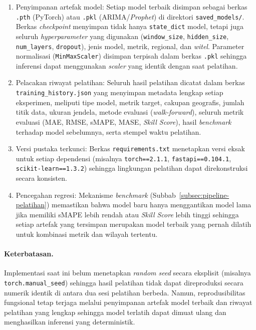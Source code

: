 \begin{enumerate}
    \item Penyimpanan artefak model: Setiap model terbaik disimpan sebagai berkas \texttt{.pth} (PyTorch) atau \texttt{.pkl} (ARIMA/\textit{Prophet}) di direktori \texttt{saved\_models/}. Berkas \textit{checkpoint} menyimpan tidak hanya \texttt{state\_dict} model, tetapi juga seluruh \textit{hyperparameter} yang digunakan (\texttt{window\_}\allowbreak\texttt{size}, \allowbreak\texttt{hidden\_}\allowbreak\texttt{size}, \allowbreak\texttt{num\_}\allowbreak\texttt{layers}, \allowbreak\texttt{dropout}), jenis model, metrik, regional, dan \textit{witel}. Parameter normalisasi (\texttt{MinMaxScaler}) disimpan terpisah dalam berkas \texttt{.pkl} sehingga inferensi dapat menggunakan \textit{scaler} yang identik dengan saat pelatihan.

    \item Pelacakan riwayat pelatihan: Seluruh hasil pelatihan dicatat dalam berkas \texttt{training\_history.json} yang menyimpan metadata lengkap setiap eksperimen, meliputi tipe model, metrik target, cakupan geografis, jumlah titik data, ukuran jendela, metode evaluasi (\textit{walk-forward}), seluruh metrik evaluasi (MAE, RMSE, sMAPE, MASE, \textit{Skill Score}), hasil \textit{benchmark} terhadap model sebelumnya, serta stempel waktu pelatihan.

    \item Versi pustaka terkunci: Berkas \texttt{requirements.txt} menetapkan versi eksak untuk setiap dependensi (misalnya \texttt{torch==2.1.1}, \allowbreak\texttt{fastapi==0.104.1}, \allowbreak\texttt{scikit-}\allowbreak\texttt{learn==1.3.2}) sehingga lingkungan pelatihan dapat direkonstruksi secara konsisten.

    \item Pencegahan regresi: Mekanisme \textit{benchmark} (Subbab~\ref{subsec:pipeline-pelatihan}) memastikan bahwa model baru hanya menggantikan model lama jika memiliki sMAPE lebih rendah atau \textit{Skill Score} lebih tinggi sehingga setiap artefak yang tersimpan merupakan model terbaik yang pernah dilatih untuk kombinasi metrik dan wilayah tertentu.
\end{enumerate}

\paragraph{Keterbatasan.} Implementasi saat ini belum menetapkan \textit{random seed} secara eksplisit (misalnya \texttt{torch.}\allowbreak\texttt{manual\_}\allowbreak\texttt{seed}) sehingga hasil pelatihan tidak dapat direproduksi secara numerik identik di antara dua sesi pelatihan berbeda. Namun, reprodusibilitas fungsional tetap terjaga melalui penyimpanan artefak model terbaik dan riwayat pelatihan yang lengkap sehingga model terlatih dapat dimuat ulang dan menghasilkan inferensi yang deterministik.

